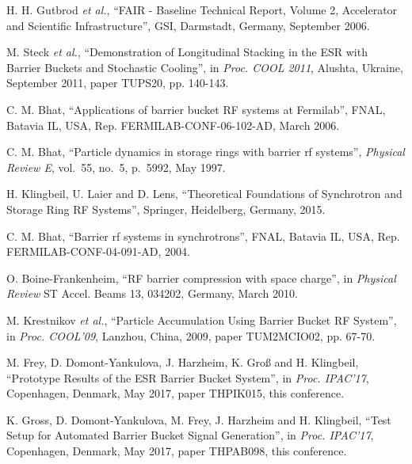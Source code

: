 \documentclass[a4paper,
               keeplastbox,%
               nospread%
              ]{jacow}
\begin{document}
\begin{thebibliography}{99} %

	H. H. Gutbrod \textit{et al.}, “FAIR - Baseline Technical Report, Volume 2, Accelerator and Scientific Infrastructure”,
	GSI, Darmstadt, Germany, September 2006.
			
	M. Steck \textit{et al.}, “Demonstration of Longitudinal Stacking in the ESR with Barrier Buckets and Stochastic Cooling”,
	in \textit{Proc. COOL 2011}, Alushta, Ukraine, September 2011, paper TUPS20, pp. 140-143.
	
	C. M. Bhat, “Applications of barrier bucket RF systems at Fermilab”,
	FNAL, Batavia IL, USA, Rep. FERMILAB-CONF-06-102-AD, March 2006.
	
		
	C. M. Bhat, “Particle dynamics in storage rings with barrier rf systems”,
	\textit{Physical Review E}, vol.~55, no.~5, p.~5992, May 1997.
	
	H. Klingbeil, U. Laier and D. Lens, “Theoretical Foundations of Synchrotron and Storage Ring RF Systems”,
	Springer, Heidelberg, Germany, 2015.
	
	C. M. Bhat, “Barrier rf systems in synchrotrons”,
	FNAL, Batavia IL, USA, Rep. FERMILAB-CONF-04-091-AD, 2004.
		
	O. Boine-Frankenheim, “RF barrier compression with space charge”,
	in \textit{Physical Review} ST Accel. Beams 13, 034202,
	Germany, March 2010.
	
	M. Krestnikov \textit{et al.}, “Particle Accumulation Using Barrier Bucket RF System”,
	in \textit{Proc. COOL'09}, Lanzhou, China, 2009, paper TUM2MCIO02, pp. 67-70.
	
	M. Frey, D. Domont-Yankulova, J. Harzheim, K. Groß and H. Klingbeil, “Prototype Results of the ESR Barrier Bucket System”,
	in \textit{Proc. IPAC'17}, Copenhagen, Denmark, May 2017, paper THPIK015, this conference.
	
	K. Gross, D. Domont-Yankulova, M. Frey, J. Harzheim and H. Klingbeil, “Test Setup for Automated Barrier Bucket Signal Generation”,
	in \textit{Proc. IPAC'17}, Copenhagen, Denmark, May 2017, paper THPAB098, this conference.


\end{thebibliography}
\end{document}
